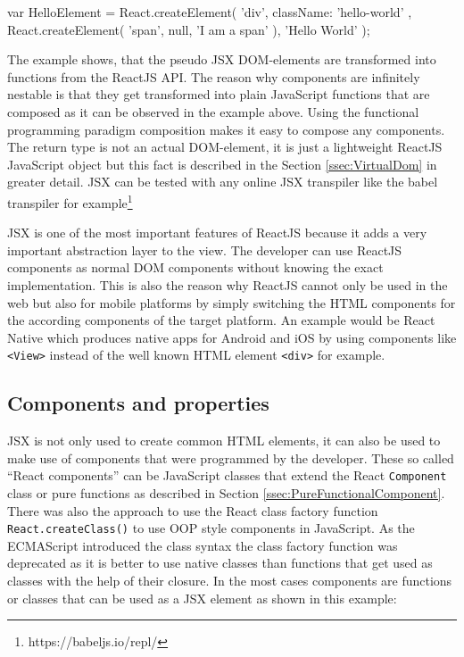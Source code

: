 \begin{JsCode}
var HelloElement = React.createElement(
  'div',
  { className: 'hello-world' },
  React.createElement(
    'span',
    null,
    'I am a span'
  ),
  'Hello World'
);
\end{JsCode}

The example shows, that the pseudo JSX DOM-elements are transformed into functions from the ReactJS API. The reason why components are infinitely nestable is that they get transformed into plain JavaScript functions that are composed as it can be observed in the example above. Using the functional programming paradigm composition makes it easy to compose any components. The return type is not an actual DOM-element, it is just a lightweight ReactJS JavaScript object but this fact is described in the Section \ref{ssec:VirtualDom} in greater detail. JSX can be tested with any online JSX transpiler like the babel transpiler for example\footnote{https://babeljs.io/repl/}

JSX is one of the most important features of ReactJS because it adds a very important abstraction layer to the view. The developer can use ReactJS components as normal DOM components without knowing the exact implementation. This is also the reason why ReactJS cannot only be used in the web but also for mobile platforms by simply switching the HTML components for the according components of the target platform. An example would be React Native which produces native apps for Android and iOS by using components like \texttt{<View>} instead of the well known HTML element \texttt{<div>} for example.

\subsection{Components and properties}

JSX is not only used to create common HTML elements, it can also be used to make use of components that were programmed by the developer. These so called \enquote{React components} can be JavaScript classes that extend the React \texttt{Component} class or pure functions as described in Section \ref{ssec:PureFunctionalComponent}. There was also the approach to use the React class factory function \texttt{React.createClass()} to use OOP style components in JavaScript. As the ECMAScript introduced the class syntax the class factory function was deprecated as it is better to use native classes than functions that get used as classes with the help of their closure. In the most cases components are functions or classes that can be used as a JSX element as shown in this example: \newline

